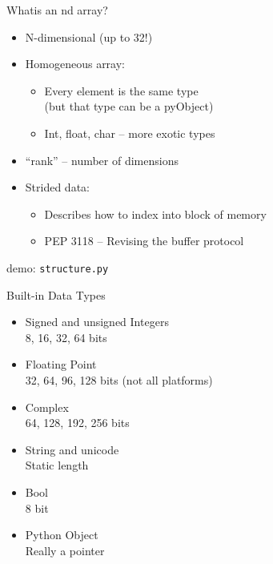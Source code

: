 \documentclass{beamer}
\begin{document}
\begin{frame}[fragile]{Whatis an nd array?}
\begin{itemize}
  \item N-dimensional (up to 32!)
  \item Homogeneous array:
  \begin{itemize}
    \item Every element is the same type\\
          (but that type can be a pyObject)
    \item Int, float, char -- more exotic types
  \end{itemize}
  \item ``rank'' – number of dimensions
  \item Strided data:
  \begin{itemize}
    \item Describes how to index into block of memory
    \item PEP 3118 -- Revising the buffer protocol
  \end{itemize}
\end{itemize}

\vfill
{\large demo: \verb|structure.py|}

\end{frame} 

\begin{frame}[fragile]{Built-in Data Types}

\begin{itemize}
  \item Signed and unsigned Integers\\
        8, 16, 32, 64 bits
  \item Floating Point\\
        32, 64, 96, 128 bits (not all platforms)
  \item Complex\\
        64, 128, 192, 256 bits
  \item String and unicode\\
        Static length 
  \item Bool \\
        8 bit
  \item Python Object \\
        Really a pointer
\end{itemize}

\end{frame} 
\end{document}
